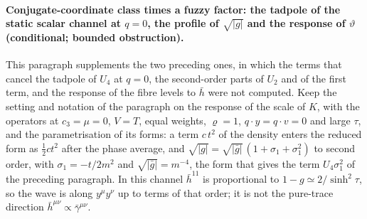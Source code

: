 \paragraph{Conjugate-coordinate class times a fuzzy factor: the tadpole of the static scalar channel at \(q=0\), the profile of \(\sqrt{|g|}\) and the response of \(\vartheta\) (conditional; bounded obstruction).}
This paragraph supplements the two preceding ones, in which the terms that cancel the tadpole of \(U_4\) at \(q=0\), the second-order parts of \(U_2\) and of the first term, and the response of the fibre levels to \(\bar h\) were not computed. Keep the setting and notation of the paragraph on the response of the scale of \(K\), with the operators at \(c_3=\mu=0\), \(V=T\), equal weights, \(\varrho=1\), \(q\cdot y=q\cdot v=0\) and large \(\tau\), and the parametrisation of its forms: a term \(c\,t^2\) of the density enters the reduced form as \(\tfrac12ct^2\) after the phase average, and \(\sqrt{|g|}=\sqrt{|\bar g|}\,(1+\sigma_1+\sigma_1^2)\) to second order, with \(\sigma_1=-t/2m^2\) and \(\sqrt{|\bar g|}=m^{-4}\), the form that gives the term \(U_4\sigma_1^2\) of the preceding paragraph. In this channel \(\bar h^{11}\) is proportional to \(1-g\simeq2/\sinh^2\tau\), so the wave is along \(y^\mu y^\nu\) up to terms of that order; it is not the pure-trace direction \(\bar h^{\mu\nu}\propto\bar\gamma^{\mu\nu}\).

